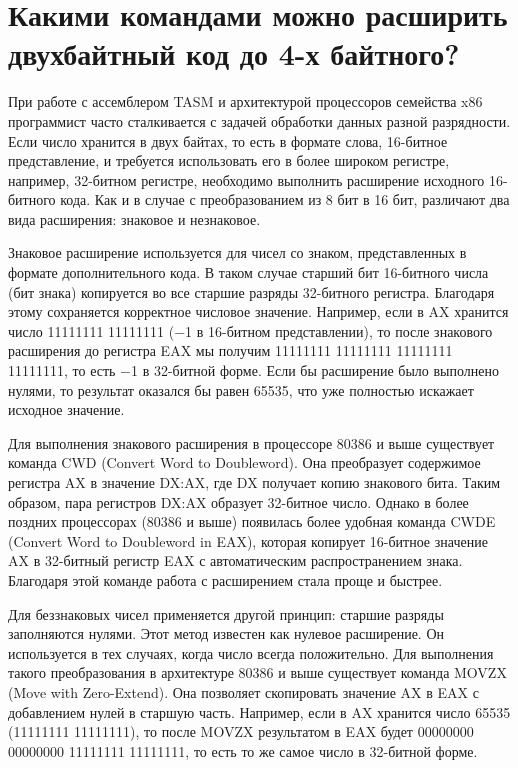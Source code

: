 \section{Какими командами можно расширить двухбайтный код до 4-х байтного?}

При работе с ассемблером TASM и архитектурой процессоров семейства x86 программист часто сталкивается с задачей обработки данных разной разрядности. Если число хранится в двух байтах, то есть в формате слова, 16-битное представление, и требуется использовать его в более широком регистре, например, 32-битном регистре, необходимо выполнить расширение исходного 16-битного кода. Как и в случае с преобразованием из 8 бит в 16 бит, различают два вида расширения: знаковое и незнаковое.

Знаковое расширение используется для чисел со знаком, представленных в формате дополнительного кода. В таком случае старший бит 16-битного числа (бит знака) копируется во все старшие разряды 32-битного регистра. Благодаря этому сохраняется корректное числовое значение. Например, если в AX хранится число 11111111 11111111 (−1 в 16-битном представлении), то после знакового расширения до регистра EAX мы получим 11111111 11111111 11111111 11111111, то есть −1 в 32-битной форме. Если бы расширение было выполнено нулями, то результат оказался бы равен 65535, что уже полностью искажает исходное значение.

Для выполнения знакового расширения в процессоре 80386 и выше существует команда CWD (Convert Word to Doubleword). Она преобразует содержимое регистра AX в значение DX:AX, где DX получает копию знакового бита. Таким образом, пара регистров DX:AX образует 32-битное число. Однако в более поздних процессорах (80386 и выше) появилась более удобная команда CWDE (Convert Word to Doubleword in EAX), которая копирует 16-битное значение AX в 32-битный регистр EAX с автоматическим распространением знака. Благодаря этой команде работа с расширением стала проще и быстрее.

Для беззнаковых чисел применяется другой принцип: старшие разряды заполняются нулями. Этот метод известен как нулевое расширение. Он используется в тех случаях, когда число всегда положительно. Для выполнения такого преобразования в архитектуре 80386 и выше существует команда MOVZX (Move with Zero-Extend). Она позволяет скопировать значение AX в EAX с добавлением нулей в старшую часть. Например, если в AX хранится число 65535 (11111111 11111111), то после MOVZX результатом в EAX будет 00000000 00000000 11111111 11111111, то есть то же самое число в 32-битной форме.

